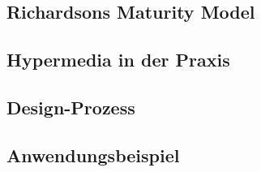 \subsection{Richardsons Maturity Model}


\subsection{Hypermedia in der Praxis}

\subsection{Design-Prozess}


\subsection{Anwendungsbeispiel}
